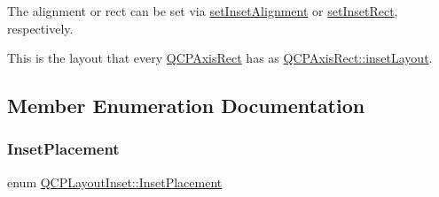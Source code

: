 The alignment or rect can be set via \hyperlink{class_q_c_p_layout_inset_a62882a4f9ad58bb0f53da12fde022abe}{set\+Inset\+Alignment} or \hyperlink{class_q_c_p_layout_inset_aa487c8378a6f9533567a2e6430099dc3}{set\+Inset\+Rect}, respectively.

This is the layout that every \hyperlink{class_q_c_p_axis_rect}{Q\+C\+P\+Axis\+Rect} has as \hyperlink{class_q_c_p_axis_rect_a949f803466619924c7018df4b511ae10}{Q\+C\+P\+Axis\+Rect\+::inset\+Layout}. 

\subsection{Member Enumeration Documentation}
\mbox{\label{class_q_c_p_layout_inset_a8b9e17d9a2768293d2a7d72f5e298192}} 
\subsubsection{\texorpdfstring{Inset\+Placement}{InsetPlacement}\hspace{0.1cm}{\footnotesize\ttfamily [1/2]}}
{\footnotesize\ttfamily enum \hyperlink{class_q_c_p_layout_inset_a8b9e17d9a2768293d2a7d72f5e298192}{Q\+C\+P\+Layout\+Inset\+::\+Inset\+Placement}}

